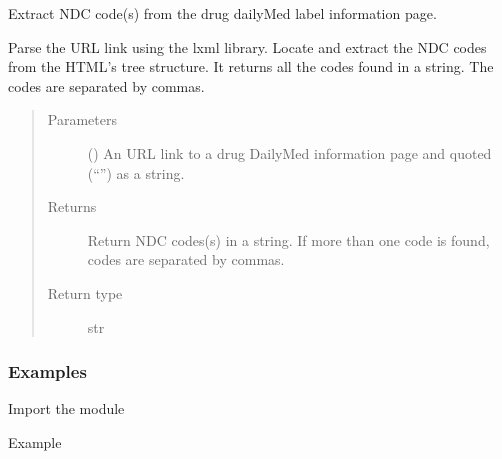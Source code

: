 \documentclass[letterpaper,10pt,english]{sphinxmanual}
\begin{document}
\begin{fulllineitems}
\label{\detokenize{biomarker_extraction:biomarker_extraction.ndc_code}}
\sphinxAtStartPar
Extract NDC code(s) from the drug dailyMed label information page.

\sphinxAtStartPar
Parse the URL link using the lxml library. Locate and extract the NDC codes from the HTML’s tree structure. It returns all the codes found in a string. The codes are separated by commas.
\begin{quote}\begin{description}
\item[{Parameters}] \leavevmode
\sphinxAtStartPar
{} () \textendash{} An URL link to a drug DailyMed information page
and quoted (“”) as a string.

\item[{Returns}] \leavevmode
\sphinxAtStartPar
Return NDC codes(s) in a string. If more than one code is found, codes are separated by commas.

\item[{Return type}] \leavevmode
\sphinxAtStartPar
str

\end{description}\end{quote}
\subsubsection*{Examples}

\sphinxAtStartPar
Import the module

\begin{sphinxVerbatim}[commandchars=\\\{\}]
   
\end{sphinxVerbatim}

\sphinxAtStartPar
Example

\begin{sphinxVerbatim}[commandchars=\\\{\}]
  
  
\end{sphinxVerbatim}

\end{fulllineitems}
\end{document}
